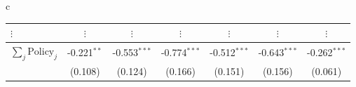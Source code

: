 \documentclass{beamer}
\begin{document}
\begin{frame}
\begin{table}
\begin{minipage}{\linewidth}
\begin{tabular}{c}
\begin{tabular}{lccc|c|c|c}
 \quad\qquad $\vdots$ &$\vdots$ &$\vdots$ &$\vdots$ &$\vdots$ &$\vdots$ &$\vdots$  \\\hline
 $\sum_j \mathrm{Policy}_j$ & -0.221$^{**}$ & -0.553$^{***}$ & -0.774$^{***}$ & -0.512$^{***}$ & -0.643$^{***}$ & -0.262$^{***}$\\
 & (0.108) & (0.124) & (0.166) & (0.151) & (0.156) & (0.061)\\


\end{tabular}
\end{tabular}
\end{minipage}
\end{table}
\end{frame}
\end{document}
